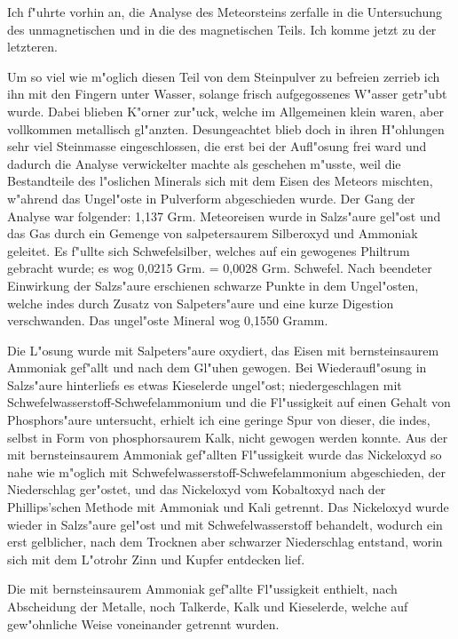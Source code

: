 \documentclass[a4paper, 11pt, oneside]{article}
\begin{document}
Ich f"uhrte vorhin an, die Analyse des Meteorsteins zerfalle in die Untersuchung des unmagnetischen und in die des magnetischen Teils. Ich komme jetzt zu der letzteren.

Um so viel wie m"oglich diesen Teil von dem Steinpulver zu befreien zerrieb ich ihn mit den Fingern unter Wasser, solange frisch aufgegossenes W"asser getr"ubt wurde. Dabei blieben K"orner zur"uck, welche im Allgemeinen klein waren, aber vollkommen metallisch gl"anzten. Desungeachtet blieb doch in ihren H"ohlungen sehr viel Steinmasse eingeschlossen, die erst bei der Aufl"osung frei ward und dadurch die Analyse verwickelter machte als geschehen m"usste, weil die Bestandteile des l"oslichen Minerals sich mit dem Eisen des Meteors mischten, w"ahrend das Ungel"oste in Pulverform abgeschieden wurde. Der Gang der Analyse war folgender: 1,137 Grm. Meteoreisen wurde in Salzs"aure gel"ost und das Gas durch ein Gemenge von salpetersaurem Silberoxyd und Ammoniak geleitet. Es f"ullte sich Schwefelsilber, welches auf ein gewogenes Philtrum gebracht wurde; es wog 0,0215 Grm. = 0,0028 Grm. Schwefel. Nach beendeter Einwirkung der Salzs"aure erschienen schwarze Punkte in dem Ungel"osten, welche indes durch Zusatz von Salpeters"aure und eine kurze Digestion verschwanden. Das ungel"oste Mineral wog 0,1550 Gramm.

Die L"osung wurde mit Salpeters"aure oxydiert, das Eisen mit bernsteinsaurem Ammoniak gef"allt und nach dem Gl"uhen gewogen. Bei Wiederaufl"osung in Salzs"aure hinterliefs es etwas Kieselerde ungel"ost; niedergeschlagen mit Schwefelwasserstoff-Schwefelammonium und die Fl"ussigkeit auf einen Gehalt von Phosphors"aure untersucht, erhielt ich eine geringe Spur von dieser, die indes, selbst in Form von phosphorsaurem Kalk, nicht gewogen werden konnte. Aus der mit bernsteinsaurem Ammoniak gef"allten Fl"ussigkeit wurde das Nickeloxyd so nahe wie m"oglich mit Schwefelwasserstoff-Schwefelammonium abgeschieden, der Niederschlag ger"ostet, und das Nickeloxyd vom Kobaltoxyd nach der Phillips'schen Methode mit Ammoniak und Kali getrennt. Das Nickeloxyd wurde wieder in Salzs"aure gel"ost und mit Schwefelwasserstoff behandelt, wodurch ein erst gelblicher, nach dem Trocknen aber schwarzer Niederschlag entstand, worin sich mit dem L"otrohr Zinn und Kupfer entdecken lief.

Die mit bernsteinsaurem Ammoniak gef"allte Fl"ussigkeit enthielt, nach Abscheidung der Metalle, noch Talkerde, Kalk und Kieselerde, welche auf gew"ohnliche Weise voneinander getrennt wurden.
\end{document}
